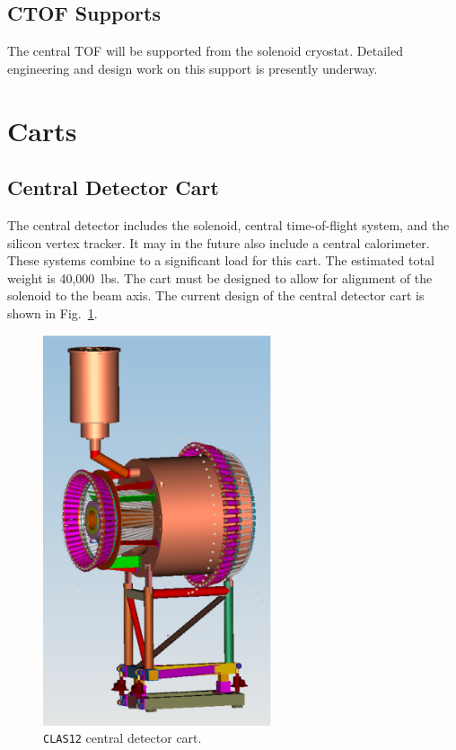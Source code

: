 \subsection{CTOF Supports} 
 
The central TOF will be supported from the solenoid cryostat.  Detailed
engineering and design work on this support is presently underway.

\section{Carts}

\subsection{Central Detector Cart}

The central detector includes the solenoid, central time-of-flight system, 
and the silicon vertex tracker.  It may in the future also include a central 
calorimeter.  These systems combine to a significant load for this cart. 
The estimated total weight is 40,000~lbs.  The cart must be designed to 
allow for alignment of the solenoid to the beam axis.  The current
design of the central detector cart is shown in Fig.~\ref{solenoidcart}.

\begin{figure}[htbp]
\centering
\includegraphics[width=0.6\textwidth]{solenoidcart.eps}
\caption{\small{{\tt CLAS12} central detector cart.
\label{solenoidcart}}}
\end{figure}

